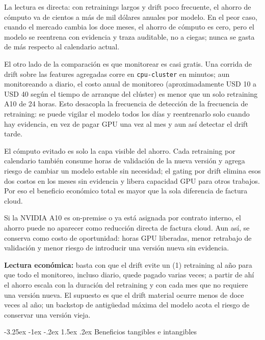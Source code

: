 \documentclass[11pt,letterpaper]{article}
\makeatletter
\renewcommand\subsection{\@startsection{subsection}{2}{\z@}
  {-3.25ex \@plus -1ex \@minus -.2ex}
  {1.5ex \@plus .2ex}
  {\large\bfseries\sffamily\color{azulTec}}}
\newcommand{\statusbox}[1]{\colorbox{verdeClaro}{\parbox{\dimexpr\linewidth-2\fboxsep}{#1}}}
\makeatother
\begin{document}
La lectura es directa: con retrainings largos y drift poco frecuente, el ahorro de cómputo va de cientos a más de mil dólares anuales por modelo. En el peor caso, cuando el mercado cambia los doce meses, el ahorro de cómputo es cero, pero el modelo se reentrena con evidencia y traza auditable, no a ciegas; nunca se gasta de más respecto al calendario actual.

El otro lado de la comparación es que monitorear es casi gratis. Una corrida de drift sobre las features agregadas corre en \texttt{cpu-cluster} en minutos; aun monitoreando a diario, el costo anual de monitoreo (aproximadamente USD 10 a USD 40 según el tiempo de arranque del clúster) es menor que un solo retraining A10 de 24 horas. Esto desacopla la frecuencia de detección de la frecuencia de retraining: se puede vigilar el modelo todos los días y reentrenarlo solo cuando hay evidencia, en vez de pagar GPU una vez al mes y aun así detectar el drift tarde.

El cómputo evitado es solo la capa visible del ahorro. Cada retraining por calendario también consume horas de validación de la nueva versión y agrega riesgo de cambiar un modelo estable sin necesidad; el gating por drift elimina esos dos costos en los meses sin evidencia y libera capacidad GPU para otros trabajos. Por eso el beneficio económico total es mayor que la sola diferencia de factura cloud.

Si la NVIDIA A10 es on-premise o ya está asignada por contrato interno, el ahorro puede no aparecer como reducción directa de factura cloud. Aun así, se conserva como costo de oportunidad: horas GPU liberadas, menor retrabajo de validación y menor riesgo de introducir una versión nueva sin evidencia.

\statusbox{\textbf{Lectura económica:} basta con que el drift evite un (1) retraining al año para que todo el monitoreo, incluso diario, quede pagado varias veces; a partir de ahí el ahorro escala con la duración del retraining y con cada mes que no requiere una versión nueva. El supuesto es que el drift material ocurre menos de doce veces al año; un backstop de antigüedad máxima del modelo acota el riesgo de conservar una versión vieja.}

\subsection{Beneficios tangibles e intangibles}
\end{document}

